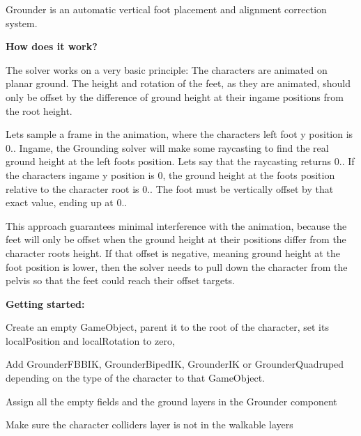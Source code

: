 Grounder is an automatic vertical foot placement and alignment correction system.

{\bfseries How does it work?}

The solver works on a very basic principle\+: The characters are animated on planar ground. The height and rotation of the feet, as they are animated, should only be offset by the difference of ground height at their ingame positions from the root height.

Let\textquotesingle{}s sample a frame in the animation, where the character\textquotesingle{}s left foot y position is 0.. Ingame, the Grounding solver will make some raycasting to find the real ground height at the left foot\textquotesingle{}s position. Let\textquotesingle{}s say that the raycasting returns 0.. If the character\textquotesingle{}s ingame y position is 0, the ground height at the foot\textquotesingle{}s position relative to the character root is 0.. The foot must be vertically offset by that exact value, ending up at 0..

This approach guarantees minimal interference with the animation, because the feet will only be offset when the ground height at their positions differ from the character root\textquotesingle{}s height. If that offset is negative, meaning ground height at the foot position is lower, then the solver needs to pull down the character from the pelvis so that the feet could reach their offset targets.



{\bfseries Getting started\+:}
\begin{DoxyItemize}
\item Create an empty Game\+Object, parent it to the root of the character, set it\textquotesingle{}s local\+Position and local\+Rotation to zero,
\item Add Grounder\+F\+B\+B\+IK, Grounder\+Biped\+IK, Grounder\+IK or Grounder\+Quadruped depending on the type of the character to that Game\+Object.
\item Assign all the empty fields and the ground layers in the Grounder component
\item Make sure the character collider\textquotesingle{}s layer is not in the walkable layers
\end{DoxyItemize}

